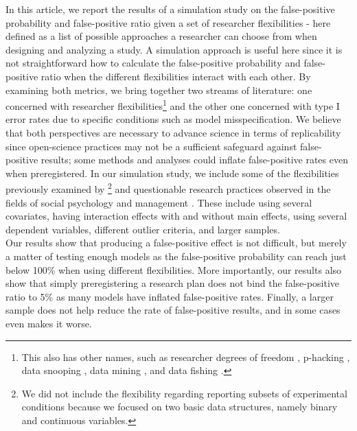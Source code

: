 In this article, we report the results of a simulation study on the false-positive probability and false-positive ratio given a set of researcher flexibilities - here defined as a list of possible approaches a researcher can choose from when designing and analyzing a study. A simulation approach is useful here since it is not straightforward how to calculate the false-positive probability and false-positive ratio when the different flexibilities interact with each other. By examining both metrics, we bring together two streams of literature: one concerned with researcher flexibilities\footnote{This also has other names, such as researcher degrees of freedom \citep{Simmons2011}, p-hacking \citep{simonsohn2014p}, data snooping \citep{white2000reality}, data mining \citep{lovell1983}, and data fishing \citep{selvin1966data}.} and the other one concerned with type I error rates due to specific conditions such as model misspecification. We believe that both perspectives are necessary to advance science in terms of replicability since open-science practices may not be a sufficient safeguard against false-positive results; some methods and analyses could inflate false-positive rates even when preregistered. In our simulation study, we include some of the flexibilities previously examined by \cite{Simmons2011}\footnote{We did not include the flexibility regarding reporting subsets of experimental conditions because we focused on two basic data structures, namely binary and continuous variables.} and questionable research practices observed in the fields of social psychology \citep{Cairo2020} and management \citep{OBoyle2017}. These include using several covariates, having interaction effects with and without main effects, using several dependent variables, different outlier criteria, and larger samples. \\ 
Our results show that producing a false-positive effect is not difficult, but merely a matter of testing enough models as the false-positive probability can reach just below 100\% when using different flexibilities. More importantly, our results also show that simply preregistering a research plan does not bind the false-positive ratio to 5\% as many models have inflated false-positive rates. Finally, a larger sample does not help reduce the rate of false-positive results, and in some cases even makes it worse. 
